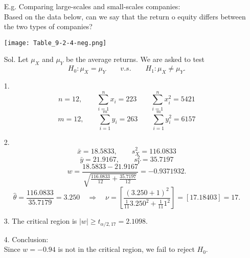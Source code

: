 \begin{frame}

	\begin{enumerate}
		\item[E.g.] Comparing large-scales and small-scales companies:\\[1em]
			Based on the data below, can we say that the return o equity differs between the two types of companies?
			\vfill
			\begin{center}
			\texttt{[image: Table\_9-2-4-neg.png]}
			\end{center}
	\end{enumerate}
\end{frame}
\begin{frame}
	\begin{enumerate}
		\item[Sol.] Let $\mu_X$ and $\mu_Y$ be the average returns. We are asked to test\\[1em]
			\[
			H_0: \mu_X = \mu_Y \qquad v.s. \qquad H_1: \mu_X\ne \mu_Y.
			\]
			\vfill
		\item[1.]
			\[
			n=12,\qquad	\sum_{i=1}^n x_i = 223
				\qquad
				\sum_{i=1}^n x_i^2 = 5421
			\]
			\[
			m=12,\qquad	\sum_{i=1}^m y_i = 263
				\qquad
				\sum_{i=1}^m y_i^2 = 6157
			\]
		\item[2.]
			\[
				\bar{x} = 18.5833,\qquad s_X^2 = 116.0833
			\]
			\[
				\bar{y} = 21.9167, \qquad s_Y^2 = 35.7197
			\]
			\[
				w= \frac{18.5833 -21.9167 }{\sqrt{ \frac{116.0833}{12}+  \frac{35.7197}{12} }} = -0.9371932.
			\]
			\[
				\hat\theta =  \frac{116.0833}{35.7179} = 3.250 \quad\Rightarrow\quad
				\nu = \left[ \frac{(3.250+1)^2}{ \frac{1}{11}3.250^2+ \frac{1}{11} 1^2 } \right]
				=\left[ 17.18403\right] = 17.
			\]
	\end{enumerate}
\end{frame}
\begin{frame}
	\begin{itemize}
		\item[3.] The critical region is $|w|\ge t_{\alpha/2,17} = 2.1098$.\\[2em]
		\item[4.] Conclusion: \\[1em] Since $w= -0.94$ is not in the critical region, we fail to reject $H_0$. \myEnd
	\end{itemize}
\end{frame}
